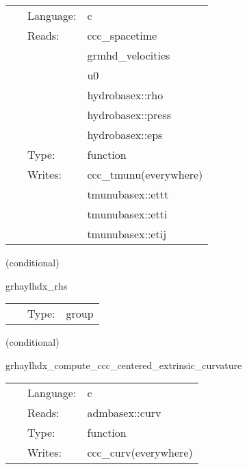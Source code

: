  \begin{tabular*}{160mm}{cll} 
~ & Language:  & c \\ 
~ & Reads:  & ccc\_spacetime \\ 
~& ~ &grmhd\_velocities\\ 
~& ~ &u0\\ 
~& ~ &hydrobasex::rho\\ 
~& ~ &hydrobasex::press\\ 
~& ~ &hydrobasex::eps\\ 
~ & Type:  & function \\ 
~ & Writes:  & ccc\_tmunu(everywhere) \\ 
~& ~ &tmunubasex::ettt\\ 
~& ~ &tmunubasex::etti\\ 
~& ~ &tmunubasex::etij\\ 
\end{tabular*} 


\vspace{5mm}

   (conditional) 

\hspace{5mm} grhaylhdx\_rhs 

\hspace{5mm}{\it evaluate rhss grhd equations } 


\hspace{5mm}

 \begin{tabular*}{160mm}{cll} 
~ & Type:  & group \\ 
\end{tabular*} 


\vspace{5mm}

   (conditional) 

\hspace{5mm} grhaylhdx\_compute\_ccc\_centered\_extrinsic\_curvature 

\hspace{5mm}{\it interpolate extrinsic curvature to cell centers } 


\hspace{5mm}

 \begin{tabular*}{160mm}{cll} 
~ & Language:  & c \\ 
~ & Reads:  & admbasex::curv \\ 
~ & Type:  & function \\ 
~ & Writes:  & ccc\_curv(everywhere) \\ 
\end{tabular*} 


